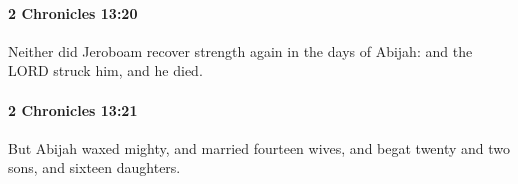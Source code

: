 		\paragraph{2 Chronicles 13:20} %
			\label{2CHRONICLES-13-20}

			Neither did Jeroboam recover strength again in the days of Abijah: and the LORD struck him, and he died.


		\paragraph{2 Chronicles 13:21} %
			\label{2CHRONICLES-13-21}

			But Abijah waxed mighty, and married fourteen wives, and begat twenty and two sons, and sixteen daughters.


